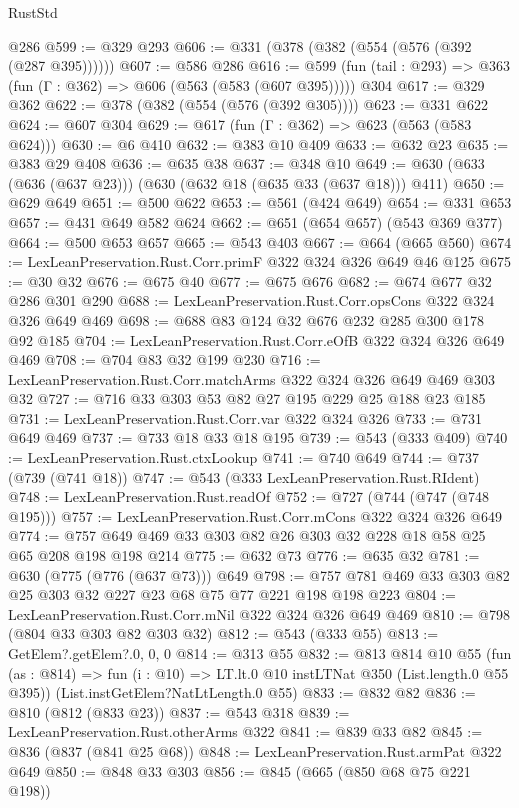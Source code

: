 \begin{lexlean}{RustStd}
\begin{coremodule}
    @286
@599 := @329 @293
@606 := @331 (@378 (@382 (@554 (@576 (@392 (@287 @395))))))
@607 := @586 @286
@616 := @599 (fun (tail : @293) => @363 (fun (Γ : @362) => @606 (@563 (@583 (@607 @395))))) @304
@617 := @329 @362
@622 := @378 (@382 (@554 (@576 (@392 @305))))
@623 := @331 @622
@624 := @607 @304
@629 := @617 (fun (Γ : @362) => @623 (@563 (@583 @624)))
@630 := @6 @410
@632 := @383 @10 @409
@633 := @632 @23
@635 := @383 @29 @408
@636 := @635 @38
@637 := @348 @10
@649 := @630 (@633 (@636 (@637 @23))) (@630 (@632 @18 (@635 @33 (@637 @18))) @411)
@650 := @629 @649
@651 := @500 @622
@653 := @561 (@424 @649)
@654 := @331 @653
@657 := @431 @649 @582 @624
@662 := @651 (@654 @657) (@543 @369 @377)
@664 := @500 @653 @657
@665 := @543 @403
@667 := @664 (@665 @560)
@674 := LexLeanPreservation.Rust.Corr.primF @322 @324 @326 @649 @46 @125
@675 := @30 @32
@676 := @675 @40
@677 := @675 @676
@682 := @674 @677 @32 @286 @301 @290
@688 := LexLeanPreservation.Rust.Corr.opsCons @322 @324 @326 @649 @469
@698 := @688 @83 @124 @32 @676 @232 @285 @300 @178 @92 @185
@704 := LexLeanPreservation.Rust.Corr.eOfB @322 @324 @326 @649 @469
@708 := @704 @83 @32 @199 @230
@716 := LexLeanPreservation.Rust.Corr.matchArms @322 @324 @326 @649 @469 @303 @32
@727 := @716 @33 @303 @53 @82 @27 @195 @229 @25 @188 @23 @185
@731 := LexLeanPreservation.Rust.Corr.var @322 @324 @326
@733 := @731 @649 @469
@737 := @733 @18 @33 @18 @195
@739 := @543 (@333 @409)
@740 := LexLeanPreservation.Rust.ctxLookup
@741 := @740 @649
@744 := @737 (@739 (@741 @18))
@747 := @543 (@333 LexLeanPreservation.Rust.RIdent)
@748 := LexLeanPreservation.Rust.readOf
@752 := @727 (@744 (@747 (@748 @195)))
@757 := LexLeanPreservation.Rust.Corr.mCons @322 @324 @326 @649
@774 := @757 @649 @469 @33 @303 @82 @26 @303 @32 @228 @18 @58 @25 @65 @208 @198 @198 @214
@775 := @632 @73
@776 := @635 @32
@781 := @630 (@775 (@776 (@637 @73))) @649
@798 := @757 @781 @469 @33 @303 @82 @25 @303 @32 @227 @23 @68 @75 @77 @221 @198 @198 @223
@804 := LexLeanPreservation.Rust.Corr.mNil @322 @324 @326 @649 @469
@810 := @798 (@804 @33 @303 @82 @303 @32)
@812 := @543 (@333 @55)
@813 := GetElem?.getElem?.{0, 0, 0}
@814 := @313 @55
@832 := @813
    @814
    @10
    @55
    (fun (as : @814) => fun (i : @10) => LT.lt.{0} @10 instLTNat @350 (List.length.{0} @55 @395))
    (List.instGetElem?NatLtLength.{0} @55)
@833 := @832 @82
@836 := @810 (@812 (@833 @23))
@837 := @543 @318
@839 := LexLeanPreservation.Rust.otherArms @322
@841 := @839 @33 @82
@845 := @836 (@837 (@841 @25 @68))
@848 := LexLeanPreservation.Rust.armPat @322 @649
@850 := @848 @33 @303
@856 := @845 (@665 (@850 @68 @75 @221 @198))

\end{coremodule}
\end{lexlean}

